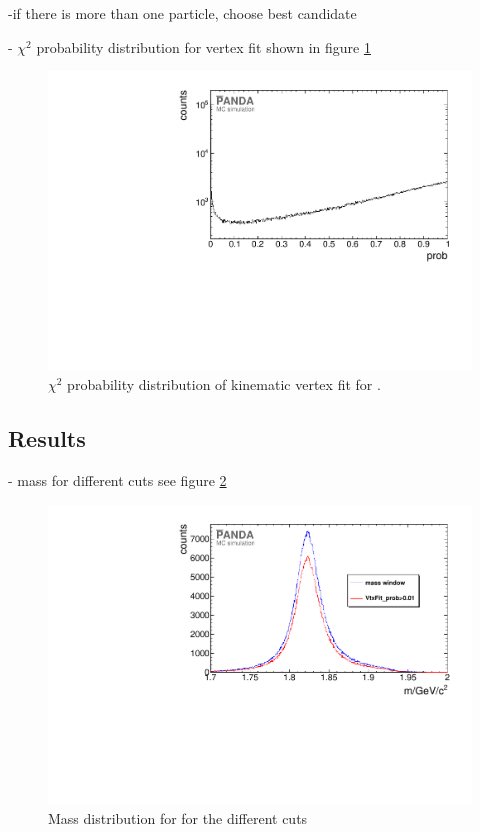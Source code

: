 		-if there is more than one particle, choose best candidate
		
		- $\chi^{2}$ probability distribution for vertex fit shown in figure \ref{fig:xi1820_prob}
		
		\begin{figure}
			\centering
			\includegraphics[width=1.\textwidth]{./plots/Xi1820/XiMinus1820_prob.pdf}
			\caption{$\chi^{2}$ probability distribution of kinematic vertex fit for \excitedcascade.}
			\label{fig:xi1820_prob}
		\end{figure}
		
	\subsection*{Results}
	
	- mass for different cuts see figure \ref{fig:xi1820_mass_diffcuts}
	
	\begin{figure}
		\centering
		\includegraphics[width=1.\textwidth]{./plots/Xi1820/XiMinus1820_m_diffcuts.pdf}
		\caption{Mass distribution for \excitedcascade for the different cuts}
		\label{fig:xi1820_mass_diffcuts}
	
	\end{figure}
	
